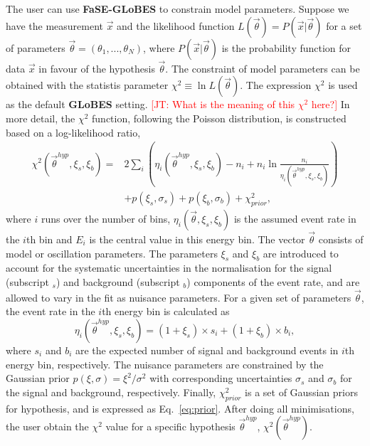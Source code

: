 \documentclass[aps,prd,nofootinbib,preprint]{revtex4}
\begin{document}
The user can use \textbf{FaSE-GLoBES} to constrain model parameters. 
{\color{blue}Suppose we have the measurement $\vec{x}$ and the likelihood function $L(\vec{\theta})=P(\vec{x}|\vec{\theta})$ for a set of parameters $\vec{\theta}=(\theta_1,...,\theta_N)$, where $P(\vec{x}|\vec{\theta})$ is the probability function for data $\vec{x}$ in favour of the hypothesis $\vec{\theta}$. The constraint of model parameters can be obtained with the statistis parameter $\chi^2\equiv \ln L(\vec{\theta})$.}
The expression $\chi^2$ is used as the default \textbf{GLoBES} setting. \textcolor{red}{[JT: What is the meaning of this $\chi^2$ here?]} In more detail, the $\chi^2$ function{\color{blue}, following the Poisson distribution,} is constructed based on a log-likelihood ratio,
\begin{align}\label{eq:chi-squared}
\chi^2(\vec{\theta}^{hyp},\xi_s,\xi_b)=&2\sum_i\left(\eta_i(\vec{\theta}^{hyp},\xi_s,\xi_b)-n_i+n_i\ln\frac{n_i}{\eta_i(\vec{\theta}^{hyp},\xi_s,\xi_b)} \right)\nonumber\\
&+p(\xi_s,\sigma_s)+p(\xi_b,\sigma_b)+\chi^2_{prior},
\end{align}
where $i$ runs over the number of bins, $\eta_i(\vec{\theta},\xi_s,\xi_b)$ is the assumed event rate in the $i$th bin and $E_i$ is the central value in this energy bin. The vector $\vec{\theta}$ consists of model or oscillation parameters. The parameters $\xi_s$ and $\xi_b$ are introduced to account for the systematic uncertainties in the normalisation for the signal (subscript $_s$) and background (subscript $_b$) components of the event rate, and are allowed to vary in the fit as nuisance parameters. For a given set of parameters $\vec{\theta}$, the event rate in the $i$th energy bin is calculated as\\
\begin{equation}
\eta_i(\vec{\theta}^{hyp},\xi_s,\xi_b)=(1+\xi_s)\times s_i+(1+\xi_b)\times b_i,
\end{equation}
where $s_i$ and $b_i$ are the expected number of signal and background events in $i$th energy bin, respectively. The nuisance parameters are constrained by the Gaussian prior $p(\xi,\sigma)=\xi^2/\sigma^2$ with corresponding uncertainties $\sigma_s$ and $\sigma_b$ for the signal and background, respectively. Finally, $\chi^2_{prior}$ is a set of Gaussian priors for hypothesis, and is expressed as Eq.~\ref{eq:prior}. After doing all minimisations, the user obtain the $\chi^2$ value for a specific hypothesis $\vec{\theta}^{hyp}$, $\chi^2(\vec{\theta}^{hyp})$.
\end{document}
